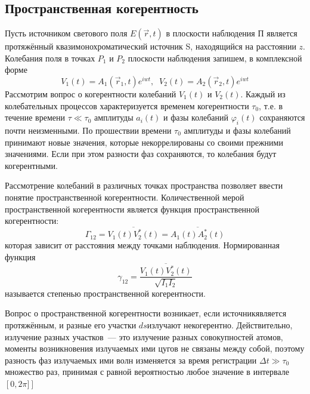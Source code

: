 \subsection{Пространственная когерентность}
\begin{figure}[ht!]
\end{figure}

Пусть источником светового поля $E(\vec{r}, t)$ в плоскости наблюдения П является протяжённый квазимонохроматический источник S, находящийся на расстоянии $z$. Колебания поля в точках $P_{1}$ и $P_{2}$ плоскости наблюдения запишем, в комплексной форме
\[
    V_{1}(t) = A_{1}(\vec{r}_{1}, t)e^{iwt},\;\; V_{2}(t) = A_{2}(\vec{r}_{2}, t)e^{iwt}
\]
Рассмотрим вопрос о когерентности колебаний $V_{1}(t)$ и $V_{2}(t)$.  Каждый из колебательных процессов характеризуется временем когерентности $\tau_{0}$, т.е. в течение времени $\tau \ll \tau_{0}$ амплитуды $a_{i}(t)$ и фазы колебаний $\varphi_{i}(t)$ сохраняются почти неизменными. По прошествии времени $\tau_{0}$ амплитуды и фазы колебаний принимают новые значения, которые некоррелированы со своими прежними значениями. Если при этом разности фаз сохраняются, то колебания будут когерентными.

Рассмотрение колебаний в различных точках пространства позволяет ввести понятие пространственной когерентности. Количественной мерой пространственной когерентности является функция пространственной когерентности:
\[
    \Gamma_{12} = \overline{V_{1}(t)V_{2}^{*}(t)} = \overline{A_{1}(t)A_{2}^{*}(t)} 
\]
которая зависит от расстояния между точками наблюдения. Нормированная функция
\[
    \gamma_{12} = \frac{\overline{V_{1}(t)V_{2}^{*}(t)}}{\sqrt{I_{1}I_{2}}}
\]
называется степенью пространственной когерентности.

Вопрос о пространственной когерентности возникает, если источникявляется протяжённым, и разные его участки $ds$излучают некогерентно. Действительно, излучение разных участков~--- это излучение разных совокупностей атомов, моменты возникновения излучаемых ими цугов не связаны между собой, поэтому разность фаз излучаемых ими волн изменяется за время регистрации $\Delta t \gg \tau_{0}$ множество раз, принимая с равной вероятностью любое значение в интервале $\left[0,2\pi]\right]$

